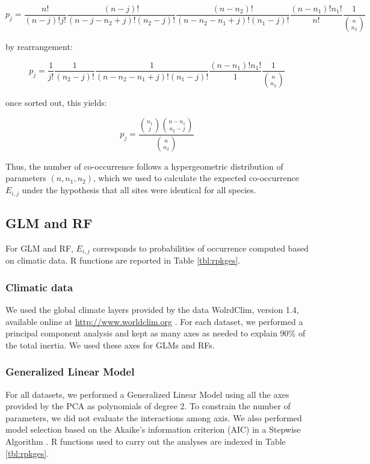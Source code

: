 \[ p_j= \frac{n!}{(n-j)!j!} \frac{(n-j)!}{(n-j-n_2+j)!(n_2-j)!} \frac{(n-n_2)!}{(n-n_2-n_1+j)!(n_1-j)!} \frac{(n-n_1)!n_1!}{n!} \frac{1}{\binom{n}{n_2}} \]

by rearrangement:

\[ p_j= \frac{1}{j!} \frac{1}{(n_2-j)!} \frac{1}{(n-n_2-n_1+j)!(n_1-j)!} \frac{(n-n_1)!n_1!}{1} \frac{1}{\binom{n}{n_2}} \]

once sorted out, this yields:

\[ p_j= \frac{\binom{n_1}{j} \binom{n-n_1}{n_2-j}}{\binom{n}{n_2}} \]

Thus, the number of co-occurrence follows a hypergeometric distribution
of parameters \((n,n_1,n_2)\), which we used to calculate the expected
co-occurrence \(E_{i,j}\) under the hypothesis that all sites were
identical for all species.

\subsection{GLM and RF}\label{glm-and-rf}

For GLM and RF, \(E_{i,j}\) corresponds to probabilities of occurrence
computed based on climatic data. R functions are reported in Table
\ref{tbl:rpkges}.

\subsubsection{Climatic data}\label{climatic-data}

We used the global climate layers provided by the data WolrdClim,
version 1.4, available online at \url{http://www.worldclim.org}
\citep{Hijmans2005}. For each dataset, we performed a principal
component analysis and kept as many axes as needed to explain 90\% of
the total inertia. We used these axes for GLMs and RFs.

\subsubsection{Generalized Linear Model}\label{generalized-linear-model}

For all datasets, we performed a Generalized Linear Model
\citep{Elith2006} using all the axes provided by the PCA as polynomials
of degree 2. To constrain the number of parameters, we did not evaluate
the interactions among axis. We also performed model selection based on
the Akaike's information criterion (AIC) in a Stepwise Algorithm
\citep{burnham2013model}. R functions used to carry out the analyses are
indexed in Table \ref{tbl:rpkges}.

